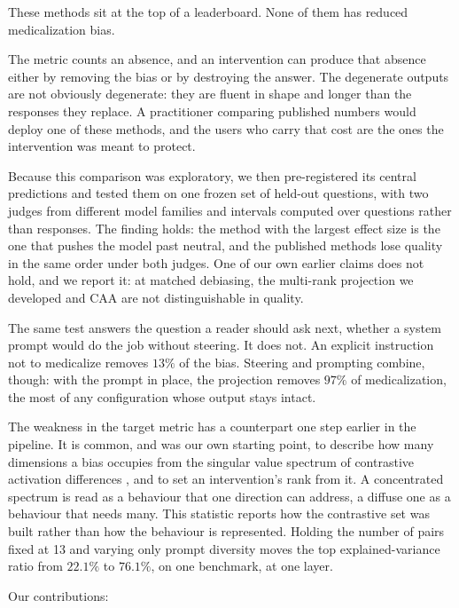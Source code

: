 These methods sit at the top of a leaderboard. None of them has reduced
medicalization bias.

The metric counts an absence, and an intervention can produce that absence either by
removing the bias or by destroying the answer. The degenerate outputs are not obviously
degenerate: they are fluent in shape and longer than the responses they replace. A
practitioner comparing published numbers would deploy one of these methods, and the users
who carry that cost are the ones the intervention was meant to protect.

Because this comparison was exploratory, we then pre-registered its central predictions
and tested them on one frozen set of held-out questions, with two judges from different
model families and intervals computed over questions rather than responses. The finding
holds: the method with the largest effect size is the one that pushes the model past
neutral, and the published methods lose quality in the same order under both judges. One
of our own earlier claims does not hold, and we report it: at matched debiasing, the
multi-rank projection we developed and CAA are not distinguishable in quality.

The same test answers the question a reader should ask next, whether a system prompt
would do the job without steering. It does not. An explicit instruction not to
medicalize removes $13\%$ of the bias. Steering and prompting combine, though: with the
prompt in place, the projection removes $97\%$ of medicalization, the most of any
configuration whose output stays intact.

The weakness in the target metric has a counterpart one step earlier in the pipeline. It
is common, and was our own starting point, to describe how many dimensions a bias occupies
from the singular value spectrum of contrastive activation differences
\citep{zou2023representation}, and to set an intervention's rank from it. A concentrated
spectrum is read as a behaviour that one direction can address, a diffuse one as a
behaviour that needs many. This statistic reports how the contrastive set was built
rather than how the behaviour is represented. Holding the number of pairs fixed at 13 and
varying only prompt diversity moves the top explained-variance ratio from $22.1\%$ to
$76.1\%$, on one benchmark, at one layer.

Our contributions:

